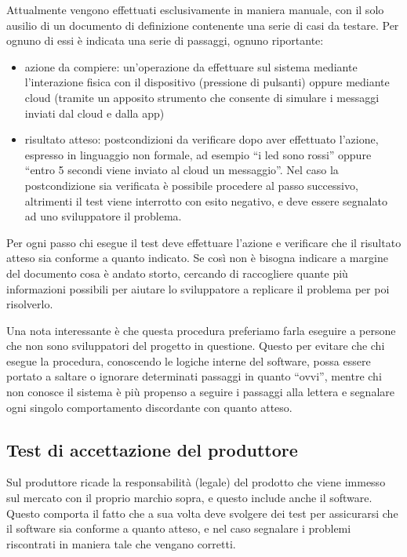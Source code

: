 \documentclass[12pt,a4paper,twoside,titlepage]{book}
\begin{document}
Attualmente vengono effettuati esclusivamente in maniera manuale, con il solo ausilio di un documento
di definizione contenente una serie di casi da testare. Per ognuno di essi è indicata una serie di 
passaggi, ognuno riportante:

\begin{itemize}
    \item azione da compiere: un'operazione da effettuare sul sistema mediante l'interazione fisica
        con il dispositivo (pressione di pulsanti) oppure mediante cloud (tramite un apposito
        strumento che consente di simulare i messaggi inviati dal cloud e dalla app)
    \item risultato atteso: postcondizioni da verificare dopo aver effettuato l'azione, espresso in
        linguaggio non formale, ad esempio ``i \acrshort{led} sono rossi'' oppure ``entro 5 secondi viene inviato al cloud un messaggio''.
        Nel caso la postcondizione sia verificata è possibile procedere al passo successivo, altrimenti
        il test viene interrotto con esito negativo, e deve essere segnalato ad uno sviluppatore il problema.
\end{itemize}

Per ogni passo chi esegue il test deve effettuare l'azione e verificare che il risultato atteso sia 
conforme a quanto indicato. Se così non è bisogna indicare a margine del documento cosa è andato 
storto, cercando di raccogliere quante più informazioni possibili per aiutare lo sviluppatore a replicare 
il problema per poi risolverlo. 

Una nota interessante è che questa procedura preferiamo farla eseguire a persone che non sono 
sviluppatori del progetto in questione. Questo per evitare che chi esegue la procedura, conoscendo
le logiche interne del software, possa essere portato a saltare o ignorare determinati
passaggi in quanto ``ovvi'', mentre chi non conosce il sistema è più propenso a seguire
i passaggi alla lettera e segnalare ogni singolo comportamento discordante con quanto
atteso.

\subsection{Test di accettazione del produttore}
\label{subsection:test_accettazione_produttore}

Sul \gls{produttore} ricade la responsabilità (legale) del prodotto
che viene immesso sul mercato con il proprio marchio sopra, e questo include anche
il software. Questo comporta il fatto che a sua volta deve svolgere dei test per
assicurarsi che il software sia conforme a quanto atteso, e nel caso segnalare i
problemi riscontrati in maniera tale che vengano corretti.
\end{document}
